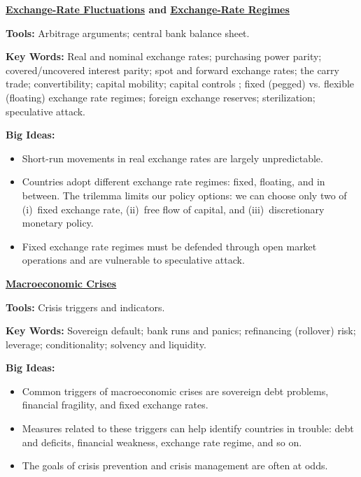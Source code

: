 \textbf{\hyperref[chp:fxf]{\underline{Exchange-Rate Fluctuations}} and \hyperref[chp:fxr]{\underline{Exchange-Rate Regimes}}}

\textbf{Tools:} Arbitrage arguments; central bank  balance sheet.

\textbf{Key Words:} Real and nominal exchange rates; purchasing power parity; covered/uncovered interest parity;
spot and forward exchange rates; the carry trade; convertibility; capital mobility; capital controls ; fixed (pegged) vs. flexible (floating) exchange rate regimes; foreign exchange reserves; sterilization; speculative attack.

\textbf{Big Ideas:}
\vspace{-0.1in}
\begin{itemize}
\item Short-run movements in real exchange rates are largely unpredictable.
\item Countries adopt different exchange rate regimes:  fixed, floating, and in between.
The trilemma limits our policy options:  we can choose only two of
(i)~fixed exchange rate, (ii)~free flow of capital,
and (iii)~discretionary monetary policy.
\item Fixed exchange rate regimes must be defended through open market operations and are vulnerable to speculative attack.
\end{itemize}

\textbf{\hyperref[chp:cris]{\underline{Macroeconomic Crises}}}

\textbf{Tools:} Crisis triggers and indicators.

\textbf{Key Words:} Sovereign default; bank runs and panics; refinancing (rollover) risk; leverage; conditionality;
solvency and liquidity.

\textbf{Big Ideas:}
\vspace{-0.1in}
\begin{itemize}
\item Common triggers of macroeconomic crises are sovereign debt problems, financial fragility,
and fixed exchange rates.

\item Measures related to these triggers can help identify countries in trouble:
debt and deficits, financial weakness, exchange rate regime, and so on.

\item The goals of crisis prevention and crisis management are often at odds.
\end{itemize}
